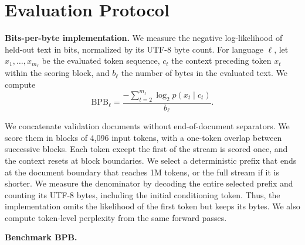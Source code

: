 \section{Evaluation Protocol}
\label{app:evaluation-protocol}

\textbf{Bits-per-byte implementation.} We measure the negative log-likelihood of held-out text in bits, normalized by its UTF-8 byte count.
For language $\ell$, let $x_1,\ldots,x_{m_\ell}$ be the evaluated token sequence, $c_t$ the context preceding token $x_t$ within the scoring block, and $b_\ell$ the number of bytes in the evaluated text. We compute
\begin{equation}
\mathrm{BPB}_\ell = \frac{-\sum_{t=2}^{m_\ell}\log_2 p(x_t \mid c_t)}{b_\ell}.
\label{eq:bpb}
\end{equation}

We concatenate validation documents without end-of-document separators. We score them in blocks of 4,096 input tokens, with a one-token overlap between successive blocks. Each token except the first of the stream is scored once, and the context resets at block boundaries. We select a deterministic prefix that ends at the document boundary that reaches 1M tokens, or the full stream if it is shorter. We measure the denominator by decoding the entire selected prefix and counting its UTF-8 bytes, including the initial conditioning token. Thus, the implementation omits the likelihood of the first token but keeps its bytes. We also compute token-level perplexity from the same forward passes.


\textbf{Benchmark BPB.} 


